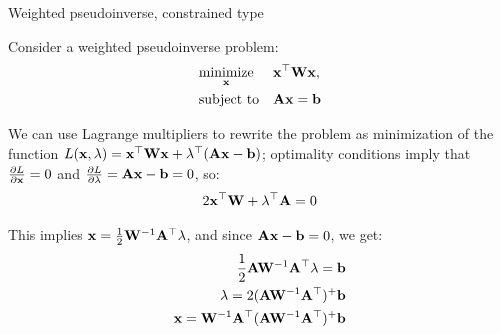 \documentclass{beamer}
\begin{document}
\begin{frame}{Weighted pseudoinverse, constrained type}
	\begin{flushleft}
		
		Consider a weighted pseudoinverse problem:
		\begin{equation}
			\begin{aligned}
				& \underset{\mathbf{x}}{\text{minimize}}
				& & \mathbf{x}^\top \mathbf{W} \mathbf{x}, \\
				& \text{subject to}
				& & \mathbf{A}\mathbf{x}=\mathbf{b}
			\end{aligned}
		\end{equation}
		
		We can use Lagrange multipliers to rewrite the problem as minimization of the function $L(\mathbf{x}, \lambda) = \mathbf{x}^\top \mathbf{W} \mathbf{x} + \lambda^\top ( \mathbf{A}\mathbf{x}-\mathbf{b})$; optimality conditions imply that $\frac{\partial L}{\partial  \mathbf{x}} = 0$ and $\frac{\partial  L}{\partial  \lambda} = \mathbf{A}\mathbf{x}-\mathbf{b} = 0$, so:
		\begin{align}
			2\mathbf{x}^\top \mathbf{W} + \lambda^\top \mathbf{A} = 0
		\end{align}		
		
		This implies $\mathbf{x} = \frac{1}{2} \mathbf{W}^{-1} \mathbf{A}^\top \lambda$, and since $\mathbf{A}\mathbf{x}-\mathbf{b} = 0$, we get:
		\begin{align}
			\frac{1}{2}\mathbf{A}\mathbf{W}^{-1} \mathbf{A}^\top \lambda= \mathbf{b} \\
			\lambda = 2 (\mathbf{A}\mathbf{W}^{-1} \mathbf{A}^\top)^+ \mathbf{b} \\
			\mathbf{x} = \mathbf{W}^{-1} \mathbf{A}^\top (\mathbf{A}\mathbf{W}^{-1} \mathbf{A}^\top)^+ \mathbf{b}
		\end{align}		
		
		
	\end{flushleft}
\end{frame}







\myqrframe
\end{document}
